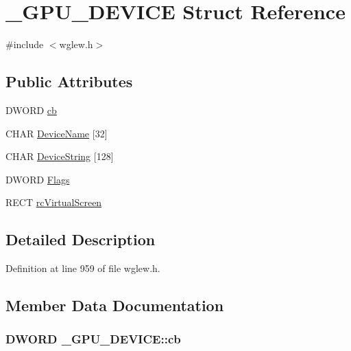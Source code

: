 \hypertarget{struct___g_p_u___d_e_v_i_c_e}{\section{\-\_\-\-G\-P\-U\-\_\-\-D\-E\-V\-I\-C\-E Struct Reference}
\label{struct___g_p_u___d_e_v_i_c_e}
}


{\ttfamily \#include $<$wglew.\-h$>$}

\subsection*{Public Attributes}
\begin{DoxyCompactItemize}
\item 
D\-W\-O\-R\-D \hyperlink{struct___g_p_u___d_e_v_i_c_e_afcb22f16ba9e526610489ff56ab78ddb}{cb}
\item 
C\-H\-A\-R \hyperlink{struct___g_p_u___d_e_v_i_c_e_a604bfab61f1a2c5d1e635837d369ba14}{Device\-Name} \mbox{[}32\mbox{]}
\item 
C\-H\-A\-R \hyperlink{struct___g_p_u___d_e_v_i_c_e_aff8b7920ccc85afcd6f325da6cdb0b73}{Device\-String} \mbox{[}128\mbox{]}
\item 
D\-W\-O\-R\-D \hyperlink{struct___g_p_u___d_e_v_i_c_e_a008db9d0f5fc13a5160805f40465f14a}{Flags}
\item 
R\-E\-C\-T \hyperlink{struct___g_p_u___d_e_v_i_c_e_aeb573bbeb3b6c589246720ef259b9a27}{rc\-Virtual\-Screen}
\end{DoxyCompactItemize}


\subsection{Detailed Description}


Definition at line 959 of file wglew.\-h.



\subsection{Member Data Documentation}
\hypertarget{struct___g_p_u___d_e_v_i_c_e_afcb22f16ba9e526610489ff56ab78ddb}{
\subsubsection[{cb}]{\setlength{\rightskip}{0pt plus 5cm}D\-W\-O\-R\-D \-\_\-\-G\-P\-U\-\_\-\-D\-E\-V\-I\-C\-E\-::cb}}\label{struct___g_p_u___d_e_v_i_c_e_afcb22f16ba9e526610489ff56ab78ddb}


